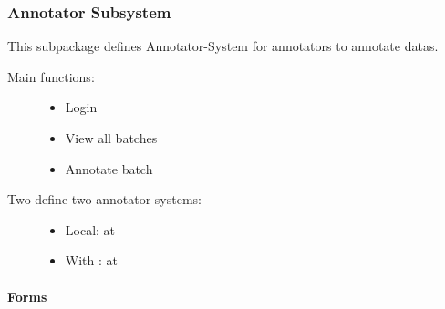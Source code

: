 \documentclass[a4paper,12pt,english]{sphinxmanual}
\begin{document}
\subsubsection{Annotator Subsystem}
\label{\detokenize{project_rst/annotator_rst/annotator:module-project.annotator.__init__}}\label{\detokenize{project_rst/annotator_rst/annotator:annotator-subsystem}}\label{\detokenize{project_rst/annotator_rst/annotator::doc}}
 

This subpackage defines Annotator-System for annotators to annotate datas.
\begin{description}
\item[{Main functions:}] \leavevmode\begin{itemize}
\item {} 
Login

\item {} 
View all batches

\item {} 
Annotate batch

\end{itemize}

\item[{Two  define two annotator systems:}] \leavevmode\begin{itemize}
\item {} 
Local: at 

\item {} 
With : at 

\end{itemize}

\end{description}
\label{\detokenize{project_rst/annotator_rst/forms:module-project.annotator.forms}}

\paragraph{Forms}
\label{\detokenize{project_rst/annotator_rst/forms:forms}}\label{\detokenize{project_rst/annotator_rst/forms::doc}}
 
\end{document}
